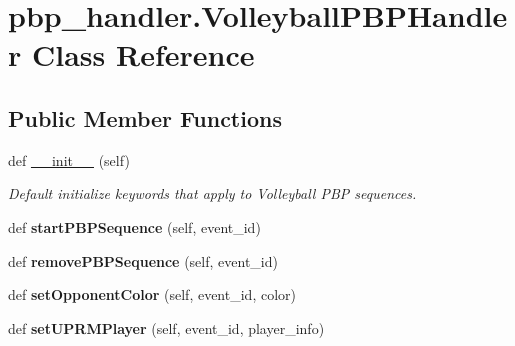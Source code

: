 \hypertarget{classpbp__handler_1_1_volleyball_p_b_p_handler}{}\section{pbp\+\_\+handler.\+Volleyball\+P\+B\+P\+Handler Class Reference}
\label{classpbp__handler_1_1_volleyball_p_b_p_handler}
\subsection*{Public Member Functions}
\begin{DoxyCompactItemize}
\item 
\mbox{\label{classpbp__handler_1_1_volleyball_p_b_p_handler_a7691f33dc4571f661fd8c21db3880d86}} 
def \hyperlink{classpbp__handler_1_1_volleyball_p_b_p_handler_a7691f33dc4571f661fd8c21db3880d86}{\+\_\+\+\_\+init\+\_\+\+\_\+} (self)
\begin{DoxyCompactList}\small\item\em Default initialize keywords that apply to Volleyball P\+BP sequences. \end{DoxyCompactList}\item 
\mbox{\label{classpbp__handler_1_1_volleyball_p_b_p_handler_a7d5b48b76046b1990553222c810fe891}} 
def {\bfseries start\+P\+B\+P\+Sequence} (self, event\+\_\+id)
\item 
\mbox{\label{classpbp__handler_1_1_volleyball_p_b_p_handler_adddd60d398611e3da520f75d25606f9d}} 
def {\bfseries remove\+P\+B\+P\+Sequence} (self, event\+\_\+id)
\item 
\mbox{\label{classpbp__handler_1_1_volleyball_p_b_p_handler_a59264b1e3edd88f5b0cd53c1f491de60}} 
def {\bfseries set\+Opponent\+Color} (self, event\+\_\+id, color)
\item 
\mbox{\label{classpbp__handler_1_1_volleyball_p_b_p_handler_ae3d371cf84bebfd94a64195567aa8cc3}} 
def {\bfseries set\+U\+P\+R\+M\+Player} (self, event\+\_\+id, player\+\_\+info)
\item 

\end{DoxyCompactItemize}
